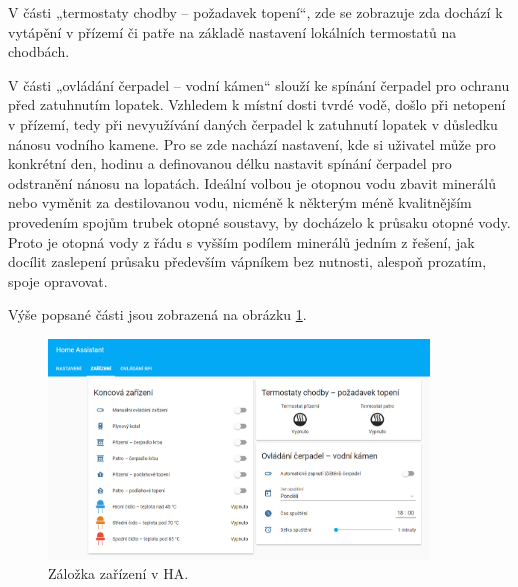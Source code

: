 V části „termostaty chodby – požadavek topení“, zde se zobrazuje zda dochází k vytápění v přízemí či patře na základě nastavení lokálních termostatů na chodbách.

V části „ovládání čerpadel – vodní kámen“ slouží ke spínání čerpadel pro ochranu před zatuhnutím lopatek. Vzhledem k místní dosti tvrdé vodě, došlo při netopení v přízemí, tedy při nevyužívání daných čerpadel k zatuhnutí lopatek v důsledku nánosu vodního kamene. Pro se zde nachází nastavení, kde si uživatel může pro konkrétní den, hodinu a definovanou délku nastavit spínání čerpadel pro odstranění nánosu na lopatách. Ideální volbou je otopnou vodu zbavit minerálů nebo vyměnit za destilovanou vodu, nicméně k některým méně kvalitnějším provedením spojům trubek otopné soustavy, by docházelo k průsaku otopné vody. Proto je otopná vody z řádu s vyšším podílem minerálů jedním z řešení, jak docílit zaslepení průsaku především vápníkem bez nutnosti, alespoň prozatím, spoje opravovat.

Výše popsané části jsou zobrazená na obrázku \ref{fig:ha-zarizeni}.


\begin{figure}[H]
    \centering
    \includegraphics[width=0.90\textwidth]{images/software-ha/ha-zarizeni.png}
    \caption{Záložka zařízení v HA.}
    \label{fig:ha-zarizeni}
\end{figure}


